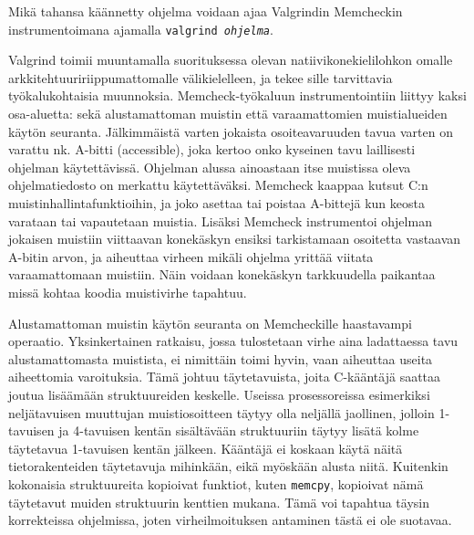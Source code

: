 Mikä tahansa käännetty ohjelma voidaan ajaa Valgrindin Memcheckin instrumentoimana ajamalla
\texttt{valgrind \emph{ohjelma}}.

Valgrind toimii muuntamalla suorituksessa olevan natiivikonekielilohkon omalle
arkkitehtuuririippumattomalle välikielelleen,
ja tekee sille tarvittavia työkalukohtaisia muunnoksia.
Memcheck-työkaluun instrumentointiin liittyy kaksi osa-aluetta:
sekä alustamattoman muistin että varaamattomien muistialueiden käytön seuranta.
Jälkimmäistä varten jokaista osoiteavaruuden tavua varten on varattu nk. A-bitti (accessible),
joka kertoo onko kyseinen tavu laillisesti ohjelman käytettävissä.
Ohjelman alussa ainoastaan itse muistissa oleva ohjelmatiedosto on merkattu käytettäväksi.
Memcheck kaappaa kutsut C:n muistinhallintafunktioihin,
ja joko asettaa tai poistaa A-bittejä kun keosta varataan tai vapautetaan muistia.
Lisäksi Memcheck instrumentoi ohjelman jokaisen muistiin viittaavan konekäskyn
ensiksi tarkistamaan osoitetta vastaavan A-bitin arvon,
ja aiheuttaa virheen mikäli ohjelma yrittää viitata varaamattomaan muistiin.
Näin voidaan konekäskyn tarkkuudella paikantaa missä kohtaa koodia
muistivirhe tapahtuu.

Alustamattoman muistin käytön seuranta on Memcheckille haastavampi operaatio.
Yksinkertainen ratkaisu, jossa tulostetaan virhe aina ladattaessa
tavu alustamattomasta muistista, ei nimittäin toimi hyvin, vaan aiheuttaa
useita aiheettomia varoituksia.
Tämä johtuu täytetavuista, joita C-kääntäjä saattaa joutua lisäämään struktuureiden keskelle.
Useissa prosessoreissa esimerkiksi neljätavuisen muuttujan muistiosoitteen täytyy olla neljällä jaollinen,
jolloin 1-tavuisen ja 4-tavuisen kentän sisältävään struktuuriin täytyy lisätä kolme täytetavua
1-tavuisen kentän jälkeen.
Kääntäjä ei koskaan käytä näitä tietorakenteiden täytetavuja mihinkään, eikä myöskään alusta niitä.
Kuitenkin kokonaisia struktuureita kopioivat funktiot, kuten \texttt{memcpy},
kopioivat nämä täytetavut muiden struktuurin kenttien mukana.
Tämä voi tapahtua täysin korrekteissa ohjelmissa,
joten virheilmoituksen antaminen tästä ei ole suotavaa.

